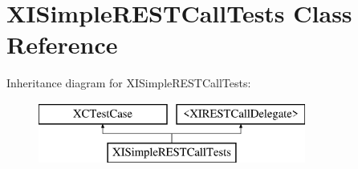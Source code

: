 \hypertarget{interface_x_i_simple_r_e_s_t_call_tests}{}\section{X\+I\+Simple\+R\+E\+S\+T\+Call\+Tests Class Reference}
\label{interface_x_i_simple_r_e_s_t_call_tests}
Inheritance diagram for X\+I\+Simple\+R\+E\+S\+T\+Call\+Tests\+:\begin{figure}[H]
\begin{center}
\leavevmode
\includegraphics[height=2.000000cm]{interface_x_i_simple_r_e_s_t_call_tests}
\end{center}
\end{figure}
